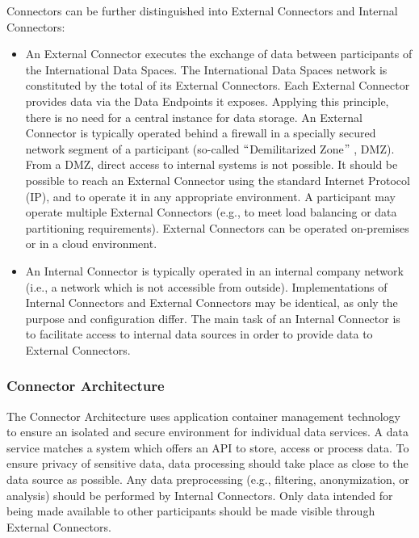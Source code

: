 Connectors can be further distinguished into External Connectors and Internal Connectors:

\begin{itemize}
	\item An External Connector executes the exchange of data between participants of the International Data Spaces. The International Data Spaces network is constituted by the total of its External Connectors. Each External Connector provides data via the Data Endpoints it exposes. Applying this principle, there is no need for a central instance for data storage. An External Connector is typically operated behind a firewall in a specially secured network segment of a participant (so-called $``$Demilitarized Zone$"$ , DMZ). From a DMZ, direct access to internal systems is not possible. It should be possible to reach an External Connector using the standard Internet Protocol (IP), and to operate it in any appropriate environment. A participant may operate multiple External Connectors (e.g., to meet load balancing or data partitioning requirements). External Connectors can be operated on-premises or in a cloud environment.

	\item An Internal Connector is typically operated in an internal company network (i.e., a network which is not accessible from outside). Implementations of Internal Connectors and External Connectors may be identical, as only the purpose and configuration differ. The main task of an Internal Connector is to facilitate access to internal data sources in order to provide data to External Connectors.
\end{itemize}

\subsubsection{Connector Architecture}
The Connector Architecture uses application container management technology to ensure an isolated and secure environment for individual data services. A data service matches a system which offers an API to store, access or process data. To ensure privacy of sensitive data, data processing should take place as close to the data source as possible. Any data preprocessing (e.g., filtering, anonymization, or analysis) should be performed by Internal Connectors. Only data intended for being made available to other participants should be made visible through External Connectors.

